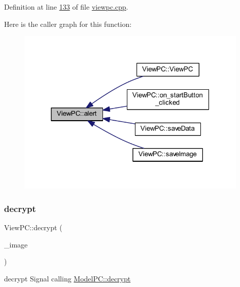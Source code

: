 Definition at line \mbox{\hyperlink{viewpc_8cpp_source_l00133}{133}} of file \mbox{\hyperlink{viewpc_8cpp_source}{viewpc.\+cpp}}.

Here is the caller graph for this function\+:
\nopagebreak
\begin{figure}[H]
\begin{center}
\leavevmode
\includegraphics[width=313pt]{class_view_p_c_a7c467169467789561078abc9d4fe57bd_icgraph}
\end{center}
\end{figure}
\mbox{\label{class_view_p_c_acf8feb98f757cc238dada1df2308e303}} 
\subsubsection{\texorpdfstring{decrypt}{decrypt}}
{\footnotesize\ttfamily View\+P\+C\+::decrypt (\begin{DoxyParamCaption}\item[{Q\+Image $\ast$}]{\+\_\+image }\end{DoxyParamCaption})\hspace{0.3cm}{\ttfamily [signal]}}



decrypt Signal calling \mbox{\hyperlink{class_model_p_c_af1f0b21565bf39808c4cdd448fad0ea8}{Model\+P\+C\+::decrypt}} 


